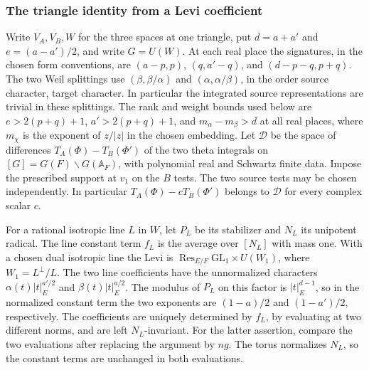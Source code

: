 \subsubsection{The triangle identity from a Levi coefficient}\label{sec:period-triangle-uniqueness}
Write \(V_A,V_B,W\) for the three spaces at one triangle, put
\(d=a+a'\) and \(e=(a-a')/2\), and write \(G=U(W)\). At each real
place the signatures, in the chosen form conventions, are
\((a-p,p)\), \((q,a'-q)\), and \((d-p-q,p+q)\). The two Weil
splittings use \((\beta,\beta/\alpha)\) and
\((\alpha,\alpha/\beta)\), in the order source character, target
character. In particular the integrated source representations are
trivial in these splittings. The rank and weight bounds used below are
\(e>2(p+q)+1\), \(a'>2(p+q)+1\), and
\(m_\alpha-m_\beta>d\) at all real places, where \(m_\chi\) is the
exponent of \(z/|z|\) in the chosen embedding. Let \(\mathscr D\)
be the space of differences \(T_A(\Phi)-T_B(\Phi')\) of the two
theta integrals on \([G]=G(F)\backslash G(\mathbb A_F)\), with
polynomial real and Schwartz finite data. Impose the prescribed support
at \(v_1\) on the \(B\) tests. The two source tests may be chosen
independently. In particular \(T_A(\Phi)-cT_B(\Phi')\) belongs to
\(\mathscr D\) for every complex scalar \(c\).

For a rational isotropic line \(L\) in \(W\), let \(P_L\) be its
stabilizer and \(N_L\) its unipotent radical. The line constant term
\(f_L\) is the average over \([N_L]\) with mass one. With a chosen
dual isotropic line the Levi is
\(\operatorname{Res}_{E/F}\mathrm{GL}_1\times U(W_1)\), where
\(W_1=L^\perp/L\). The two line coefficients have the unnormalized
characters \(\alpha(t)|t|_E^{a'/2}\) and
\(\beta(t)|t|_E^{a/2}\). The modulus of \(P_L\) on this factor is
\(|t|_E^{d-1}\), so in the normalized constant term the two
exponents are \((1-a)/2\) and \((1-a')/2\), respectively.
The coefficients are uniquely determined by \(f_L\),
by evaluating at two different norms, and are left \(N_L\)-invariant.
For the latter assertion, compare the two evaluations after replacing
the argument by \(ng\). The torus normalizes \(N_L\), so the
constant terms are unchanged in both evaluations.

